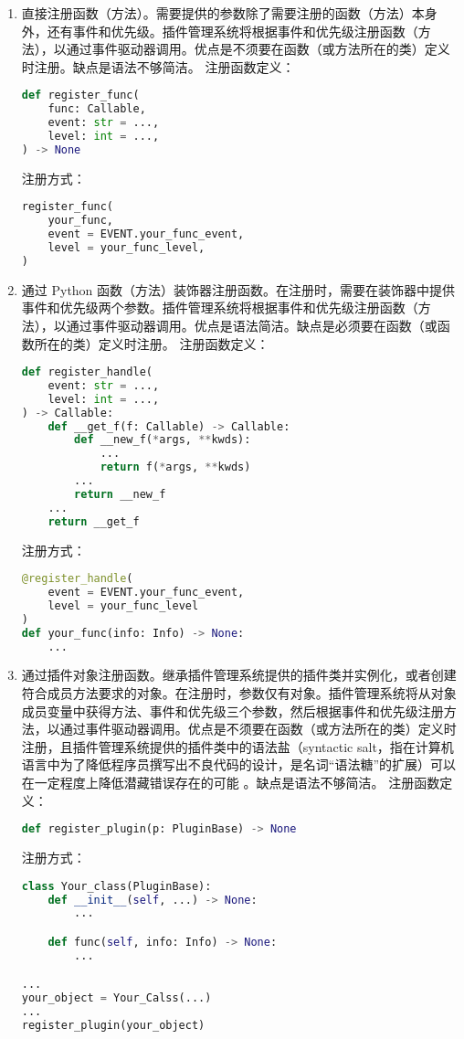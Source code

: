 \begin{enumerate}
    \item 直接注册函数（方法）。需要提供的参数除了需要注册的函数（方法）本身外，还有事件和优先级。插件管理系统将根据事件和优先级注册函数（方法），以通过事件驱动器调用。优点是不须要在函数（或方法所在的类）定义时注册。缺点是语法不够简洁。
    注册函数定义：
\begin{lstlisting}[language=Python]
def register_func(
    func: Callable,
    event: str = ...,
    level: int = ...,
) -> None
\end{lstlisting}
    注册方式：
\begin{lstlisting}[language=Python]
register_func(
    your_func,
    event = EVENT.your_func_event,
    level = your_func_level,
)
\end{lstlisting}
    \item 通过 Python 函数（方法）装饰器注册函数。在注册时，需要在装饰器中提供事件和优先级两个参数。插件管理系统将根据事件和优先级注册函数（方法），以通过事件驱动器调用。优点是语法简洁。缺点是必须要在函数（或函数所在的类）定义时注册。
    注册函数定义：
\begin{lstlisting}[language=Python]
def register_handle(
    event: str = ...,
    level: int = ...,
) -> Callable:
    def __get_f(f: Callable) -> Callable:
        def __new_f(*args, **kwds):
            ...
            return f(*args, **kwds)
        ...
        return __new_f
    ...
    return __get_f
\end{lstlisting}
    注册方式：
\begin{lstlisting}[language=Python]
@register_handle(
    event = EVENT.your_func_event,
    level = your_func_level
)
def your_func(info: Info) -> None:
    ...
\end{lstlisting}
    \item 通过插件对象注册函数。继承插件管理系统提供的插件类并实例化，或者创建符合成员方法要求的对象。在注册时，参数仅有对象。插件管理系统将从对象成员变量中获得方法、事件和优先级三个参数，然后根据事件和优先级注册方法，以通过事件驱动器调用。优点是不须要在函数（或方法所在的类）定义时注册，且插件管理系统提供的插件类中的语法盐（syntactic salt，指在计算机语言中为了降低程序员撰写出不良代码的设计，是名词“语法糖”的扩展）可以在一定程度上降低潜藏错误存在的可能 \cite{wiki_sugar}。缺点是语法不够简洁。
    注册函数定义：
\begin{lstlisting}[language=Python]
def register_plugin(p: PluginBase) -> None
\end{lstlisting}
    注册方式：
\begin{lstlisting}[language=Python]
class Your_class(PluginBase):
    def __init__(self, ...) -> None:
        ...

    def func(self, info: Info) -> None:
        ...

...
your_object = Your_Calss(...)
...
register_plugin(your_object)
\end{lstlisting}
\end{enumerate}

